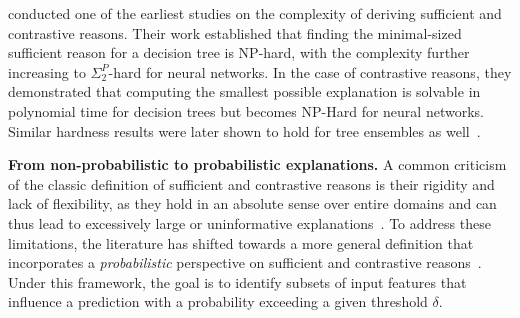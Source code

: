 \documentclass{article}
\begin{document}

\cite{BaMoPeSu20} conducted one of the earliest studies on the complexity of deriving sufficient and contrastive reasons. Their work established that finding the minimal-sized sufficient reason for a decision tree is NP-hard, with the complexity further increasing to $\Sigma^P_2$-hard for neural networks. In the case of contrastive reasons, they demonstrated that computing the smallest possible explanation is solvable in polynomial time for decision trees but becomes NP-Hard for neural networks. Similar hardness results were later shown to hold for tree ensembles as well~\citep{izyamajo21, ordyniak2024explaining, audemard2022trading}.

\textbf{From non-probabilistic to probabilistic explanations.} 
A common criticism of the classic definition of sufficient and contrastive reasons is their rigidity and lack of flexibility, as they hold in an absolute sense over entire domains and can thus lead to excessively large or uninformative explanations~\citep{ignatiev2019abduction, ignatiev2020towards, arenas2022computing, waldchen2021computational}. %
To address these limitations, the literature has shifted towards a more general definition that incorporates a \emph{probabilistic} perspective on sufficient and contrastive reasons~\citep{waldchen2021computational, arenas2022computing, blanc2021provably, izza2023computing, xue2023stability}. Under this framework, the goal is to identify subsets of input features that influence a prediction with a probability exceeding a given threshold $\delta$.
\end{document}
